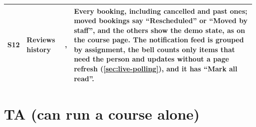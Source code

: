 {\begin{xltabular}{\linewidth}{@{}l P{34mm} P{30mm} L@{}}
  S12 & Reviews history & ,  & Every booking, including cancelled and past ones; moved bookings say ``Rescheduled'' or ``Moved by staff'', and the others show the demo state, as on the course page. The notification feed is grouped by assignment, the bell counts only items that need the person and updates without a page refresh (\cref{sec:live-polling}), and it has ``Mark all read''.\\
  \bottomrule
\end{xltabular}}

\section{TA (can run a course alone)}

